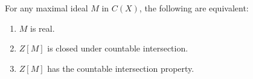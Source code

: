 For any maximal ideal $M$ in $C(X)$, the following are equivalent:

\begin{enumerate}
\item[(1)] $M$ is real.
\item[(2)] $Z[M]$ is closed under countable intersection.
\item[(3)] $Z[M]$ has the countable intersection property.
\end{enumerate}
